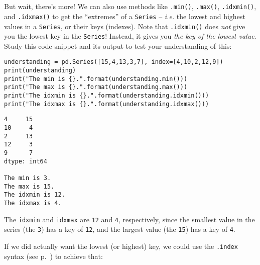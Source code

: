 
\chapter[\small Assoc.~arrays in Python (3 of 3)]{\LARGE\selectfont{Associative
arrays in Python (3 of 3)}}
\label{ch:assocArraysInPython3}


But wait, there's more! We can also use methods like \texttt{.min()},
\texttt{.max()}, \texttt{.idxmin()}, and \texttt{.idxmax()} to get the
``extremes'' of a \texttt{Series} -- \textit{i.e.} the lowest and highest
values in a \texttt{Series}, or their keys (indexes). Note that
\texttt{.idxmin()} does \textit{not} give you the lowest key in the
\texttt{Series}! Instead, it gives you \textit{the key of the lowest value}.
Study this code snippet and its output to test your understanding of this:


\begin{Verbatim}[fontsize=\footnotesize,samepage=true,frame=single,framesep=3mm]
understanding = pd.Series([15,4,13,3,7], index=[4,10,2,12,9])
print(understanding)
print("The min is {}.".format(understanding.min()))
print("The max is {}.".format(understanding.max()))
print("The idxmin is {}.".format(understanding.idxmin()))
print("The idxmax is {}.".format(understanding.idxmax()))
\end{Verbatim}

\begin{Verbatim}[fontsize=\footnotesize,samepage=true,frame=leftline,framesep=5mm,framerule=1mm]
4     15
10     4
2     13
12     3
9      7
dtype: int64

The min is 3.
The max is 15.
The idxmin is 12.
The idxmax is 4.
\end{Verbatim}

The \texttt{idxmin} and \texttt{idxmax} are \texttt{12} and \texttt{4},
respectively, since the smallest value in the series (the \texttt{3}) has a key
of \texttt{12}, and the largest value (the \texttt{15}) has a key of
\texttt{4}.


If we did actually want the lowest (or highest) key, we could use the
\texttt{.index} syntax (see p.~\pageref{dotIndex}) to achieve that:

